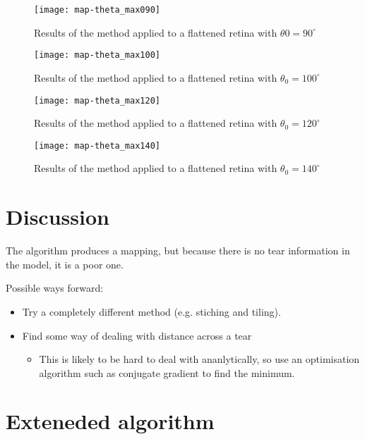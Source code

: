\documentclass{article}
\begin{document}
\begin{figure}
  \centering
  \texttt{[image: map-theta\_max090]}
  \caption{Results of the method applied to a flattened retina with $\theta0=90^\circ$}
  \label{fold-retina:fig:map090}
\end{figure}

\begin{figure}
  \centering
  \texttt{[image: map-theta\_max100]}
  \caption{Results of the method applied to a flattened retina with $\theta_0=100^\circ$}
  \label{fold-retina:fig:map100}
\end{figure}

\begin{figure}
  \centering
  \texttt{[image: map-theta\_max120]}
  \caption{Results of the method applied to a flattened retina with $\theta_0=120^\circ$}
  \label{fold-retina:fig:map120}
\end{figure}

\begin{figure}
  \centering
  \texttt{[image: map-theta\_max140]}
  \caption{Results of the method applied to a flattened retina with $\theta_0=140^\circ$}
  \label{fold-retina:fig:map140}
\end{figure}

\section{Discussion}
\label{fold-retina:sec:discussion}

The algorithm produces a mapping, but because there is no tear
information in the model, it is a poor one.

Possible ways forward:
\begin{itemize}
\item Try a completely different method (e.g. stiching and tiling).
\item Find some way of dealing with distance across a tear
  \begin{itemize}
  \item This is likely to be hard to deal with ananlytically, so use an
  optimisation algorithm such as conjugate gradient to find the minimum.
  \end{itemize}
\end{itemize}

\section{Exteneded algorithm}
\label{fold-retina:sec:exteneded-algorithm}
\end{document}
